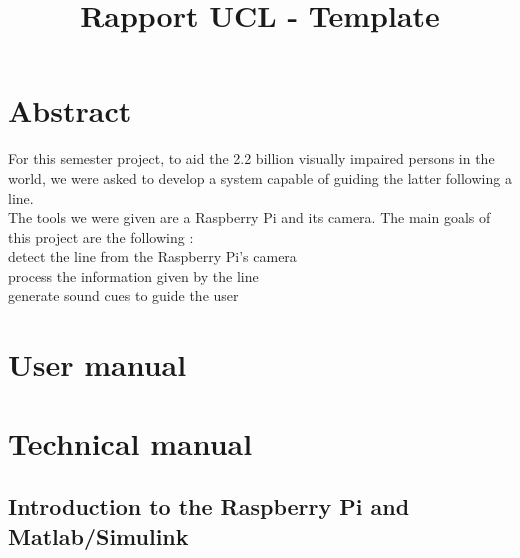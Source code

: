 \documentclass{rapport}
\title{Rapport UCL - Template} %
\begin{document}



        
\fairemarges %
\fairepagedegarde %
\tableofcontents%
\newpage

\section{Abstract}

For this semester project, to aid the 2.2 billion visually impaired persons in the world, we were asked to develop a system capable of guiding the latter following a line.\\
The tools we were given are a Raspberry Pi and its camera. The main goals of this project are the following :\\
detect the line from the Raspberry Pi’s camera\\
process the information given by the line\\
generate sound cues to guide the user\\

\section {User manual}

\section{Technical manual}

\subsection{Introduction to the Raspberry Pi and Matlab/Simulink
}
    
\end{document}
